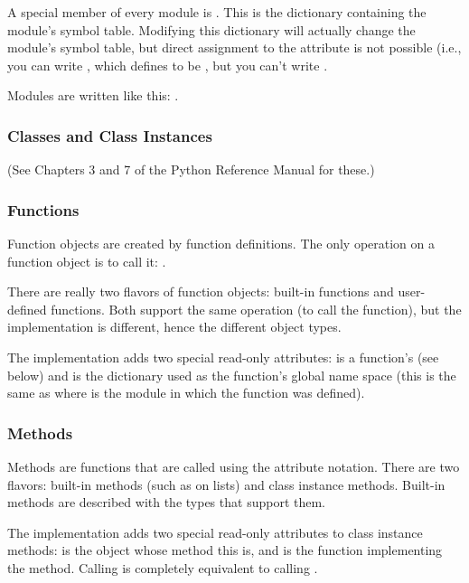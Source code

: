 A special member of every module is .
This is the dictionary containing the module's symbol table.
Modifying this dictionary will actually change the module's symbol
table, but direct assignment to the  attribute is not
possible (i.e., you can write , which
defines  to be , but you can't write .

Modules are written like this: .

\subsubsection{Classes and Class Instances}

(See Chapters 3 and 7 of the Python Reference Manual for these.)

\subsubsection{Functions}

Function objects are created by function definitions.  The only
operation on a function object is to call it:
.

There are really two flavors of function objects: built-in functions
and user-defined functions.  Both support the same operation (to call
the function), but the implementation is different, hence the
different object types.

The implementation adds two special read-only attributes:
 is a function's  (see below) and
 is the dictionary used as the function's
global name space (this is the same as  where
 is the module in which the function  was defined).

\subsubsection{Methods}

Methods are functions that are called using the attribute notation.
There are two flavors: built-in methods (such as  on
lists) and class instance methods.  Built-in methods are described
with the types that support them.

The implementation adds two special read-only attributes to class
instance methods:  is the object whose method this
is, and  is the function implementing the method.
Calling  is completely equivalent to calling
.

